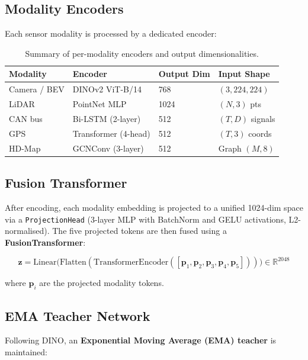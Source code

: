 \documentclass[12pt,a4paper]{article}
\begin{document}
\subsection{Modality Encoders}

Each sensor modality is processed by a dedicated encoder:

\begin{table}[H]
\centering
\renewcommand{\arraystretch}{1.4}
\begin{tabularx}{\textwidth}{lXll}
\toprule
\textbf{Modality} & \textbf{Encoder} & \textbf{Output Dim} & \textbf{Input Shape} \\
\midrule
Camera / BEV & DINOv2 ViT-B/14 & 768 & $(3, 224, 224)$ \\
LiDAR         & PointNet MLP     & 1024 & $(N, 3)$ pts \\
CAN bus       & Bi-LSTM (2-layer) & 512 & $(T, D)$ signals \\
GPS           & Transformer (4-head) & 512 & $(T, 3)$ coords \\
HD-Map        & GCNConv (3-layer) & 512 & Graph $(M, 8)$ \\
\bottomrule
\end{tabularx}
\caption{Summary of per-modality encoders and output dimensionalities.}
\end{table}

\subsection{Fusion Transformer}

After encoding, each modality embedding is projected to a unified 1024-dim space via a
\texttt{ProjectionHead} (3-layer MLP with BatchNorm and GELU activations, L2-normalised).
The five projected tokens are then fused using a \textbf{FusionTransformer}:

\begin{equation}
    \mathbf{z} = \text{Linear}\bigl(\text{Flatten}(\text{TransformerEncoder}([\mathbf{p}_1, \mathbf{p}_2, \mathbf{p}_3, \mathbf{p}_4, \mathbf{p}_5]))\bigr) \in \mathbb{R}^{2048}
\end{equation}

where $\mathbf{p}_i$ are the projected modality tokens.

\subsection{EMA Teacher Network}

Following DINO, an \textbf{Exponential Moving Average (EMA) teacher} is maintained:
\end{document}
